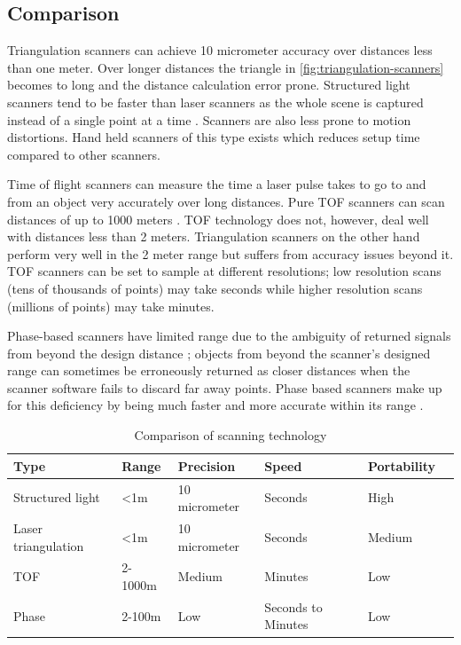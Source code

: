 \subsection{Comparison}

Triangulation scanners can achieve 10 micrometer accuracy over distances less than one meter. Over longer distances the triangle in \autoref{fig:triangulation-scanners} becomes to long and the distance calculation error prone. Structured light scanners tend to be faster than laser scanners as the whole scene is captured instead of a single point at a time \cite{Brown2012}. Scanners are also less prone to motion distortions. Hand held scanners of this type exists which reduces setup time compared to other scanners.

Time of flight scanners can measure the time a laser pulse takes to go to and from an object very accurately over long distances. Pure TOF scanners can scan distances of up to 1000 meters \cite{Form2014}. TOF technology does not, however, deal well with distances less than 2 meters. Triangulation scanners on the other hand perform very well in the 2 meter range but suffers from accuracy issues beyond it. TOF scanners can be set to sample at different resolutions; low resolution scans (tens of thousands of points) may take seconds while higher resolution scans (millions of points) may take minutes.

Phase-based scanners have limited range due to the ambiguity of returned signals from beyond the design distance \cite{Bhurtha}; objects from beyond the scanner's designed range can sometimes be erroneously returned as closer distances when the scanner software fails to discard far away points. Phase based scanners make up for this deficiency by being much faster and more accurate within its range \cite{Form2014}.


\begin{table}
\begin{tabular}{ |l|l|l|l|l|l| }
  \hline
  Type &              Range &        Precision       & Speed & Portability \\
  \hline
  Structured light &    <1m     & 10 micrometer  & Seconds & High \\
  Laser triangulation & <1m     & 10 micrometer  & Seconds  & Medium \\     
  TOF &                 2-1000m & Medium      & Minutes & Low \\
  Phase &               2-100m & Low         & Seconds to Minutes & Low \\
  \hline  
\end{tabular}
\caption{Comparison of scanning technology}
\end{table}


